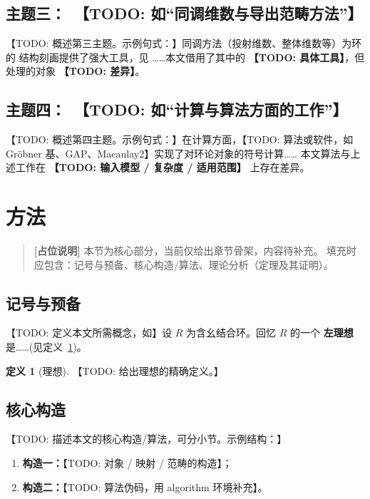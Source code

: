 \documentclass[11pt]{ctexart}
\theoremstyle{plain}
\theoremstyle{definition}
\newtheorem{definition}[theorem]{定义}
\theoremstyle{remark}
\begin{document}
\subsection{主题三：\ 【TODO: 如“同调维数与导出范畴方法”】}
\label{sec:rel3}
【TODO: 概述第三主题。示例句式：】同调方法（投射维数、整体维数等）为环的
结构刻画提供了强大工具，见 \cite{placeholder-weibel}……本文借用了其中的
\textbf{【TODO: 具体工具】}，但处理的对象 \textbf{【TODO: 差异】}。

\subsection{主题四：\ 【TODO: 如“计算与算法方面的工作”】}
\label{sec:rel4}
【TODO: 概述第四主题。示例句式：】在计算方面，【TODO: 算法或软件，如
Gr\"obner 基、GAP、Macaulay2】实现了对环论对象的符号计算……
本文算法与上述工作在 \textbf{【TODO: 输入模型 / 复杂度 / 适用范围】} 上存在差异。

\section{方法}
\label{sec:method}
\begin{quote}
\textbf{[占位说明]} 本节为核心部分，当前仅给出章节骨架，内容待补充。
填充时应包含：记号与预备、核心构造/算法、理论分析（定理及其证明）。
\end{quote}

\subsection{记号与预备}
\label{sec:method-prelim}
【TODO: 定义本文所需概念，如】设 $R$ 为含幺结合环。回忆 $R$ 的一个
\textbf{左理想} 是……(见定义~\ref{def:ideal})。

\begin{definition}[理想]
\label{def:ideal}
【TODO: 给出理想的精确定义。】
\end{definition}

\subsection{核心构造}
\label{sec:method-core}
【TODO: 描述本文的核心构造/算法，可分小节。示例结构：】
\begin{enumerate}
  \item \textbf{构造一：}【TODO: 对象 / 映射 / 范畴的构造】；
  \item \textbf{构造二：}【TODO: 算法伪码，用 algorithm 环境补充】。
\end{enumerate}
\end{document}
